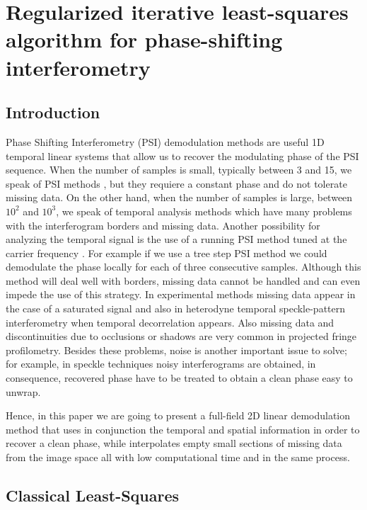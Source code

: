 \chapter{Regularized iterative least-squares algorithm for phase-shifting
interferometry}

\section{Introduction}

Phase Shifting Interferometry (PSI) demodulation methods are useful 1D
temporal linear systems that allow us to recover the modulating phase of the
PSI sequence. When the number of samples is small, typically between 3 and 15,
we speak of PSI methods \cite{Malacara,GeneralTheory}, but they requiere a
constant phase and do not tolerate missing data. On the other hand, when the
number of samples is large, between $10^2$ and $10^3$, we speak of temporal
analysis methods \cite{RQF,temporal_1,temporal_2} which have many problems with
the interferogram borders and missing data. Another possibility for analyzing
the temporal signal is the use of a running PSI method tuned at the carrier
frequency \cite{RQF,temporal_1,temporal_2,Mariano2,Medina,Zeng}. For example if
we use a tree step PSI method we could demodulate the phase locally for each of
three consecutive samples. Although this method will deal well with borders,
missing data cannot be handled and can even impede the use of this strategy. In
experimental methods missing data appear in the case of a saturated signal and
also in heterodyne temporal speckle-pattern interferometry when temporal
decorrelation appears. Also missing data and discontinuities due to occlusions
or shadows are very common in projected fringe profilometry. Besides these
problems, noise is another important issue to solve; for example, in speckle
techniques \cite{Malacara,temporal_2} noisy interferograms are obtained, in
consequence, recovered phase have to be treated to obtain a clean phase easy to
unwrap.

Hence, in this paper we are going to present a full-field 2D linear demodulation
method that uses in conjunction the temporal and spatial information in order
to recover a clean phase, while interpolates empty small sections of missing
data from the image space all with low computational time and in the same
process.

\section{Classical Least-Squares}


